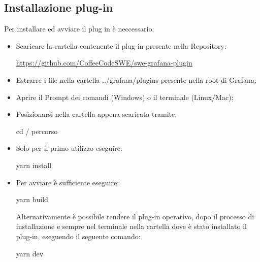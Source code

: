 \documentclass[../manuale-utente.tex]{subfiles}
\begin{document}
\subsection{Installazione plug-in}%
\label{subs:installazione-plug-in}
Per installare ed avviare il plug in è neccessario:
\begin{itemize}
  \item Scaricare la cartella contenente il plug-in presente nella Repository: \\
  \centerline{\url{https://github.com/CoffeeCodeSWE/swe-grafana-plugin}}
  \item Estrarre i file nella cartella ../grafana/plugins presente nella root di Grafana;
  \item Aprire il Prompt dei comandi (Windows) o il terminale (Linux/Mac);
  \item Posizionarsi nella cartella appena scaricata tramite: \\
  \centerline{cd / percorso}
  \item Solo per il primo utilizzo eseguire: \\
  \centerline{yarn install}
  \item Per avviare è sufficiente eseguire: \\
  \centerline{yarn build}
  \newline
  Alternativamente è possibile rendere il plug-in operativo, dopo il processo di installazione e sempre nel terminale nella cartella dove è stato installato il plug-in, eseguendo il seguente comando: \\
  \newline
  \centerline{yarn dev}
\end{itemize}
\end{document}
